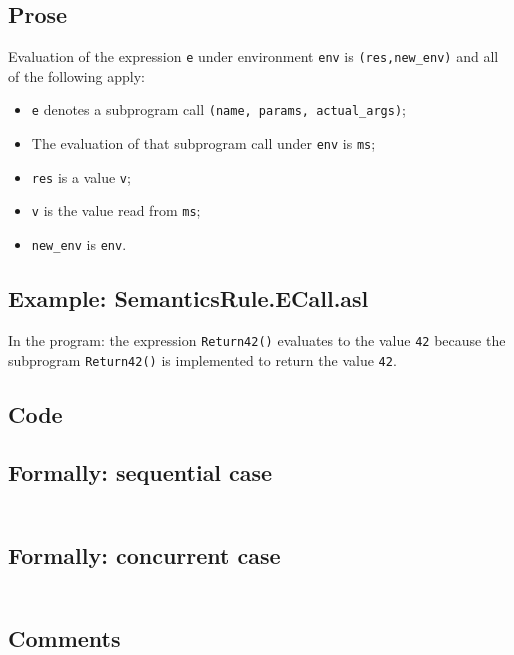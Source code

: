 \documentclass{book}
\begin{document}
  \subsection{Prose}

  Evaluation of the expression \texttt{e} under environment \texttt{env} is
  \texttt{(res,new\_env)} and all of the following apply:
  \begin{itemize}
  \item \texttt{e} denotes a subprogram call \texttt{(name, params, actual\_args)};
  \item The evaluation of that subprogram call under \texttt{env} is \texttt{ms};
  \item \texttt{res} is a value \texttt{v};
  \item \texttt{v} is the value read from \texttt{ms};
  \item \texttt{new\_env} is \texttt{env}.
  \end{itemize}

  \subsection{Example: SemanticsRule.ECall.asl}
    In the program:
    the expression \texttt{Return42()} evaluates to the value \texttt{42} because the
    subprogram \texttt{Return42()} is implemented to return the value \texttt{42}.

  \subsection{Code}

  \subsection{Formally: sequential case}
  \begin{align}
  \end{align} 

  \subsection{Formally: concurrent case}
  \begin{align}
  \end{align} 

  \subsection{Comments}
\end{document}
